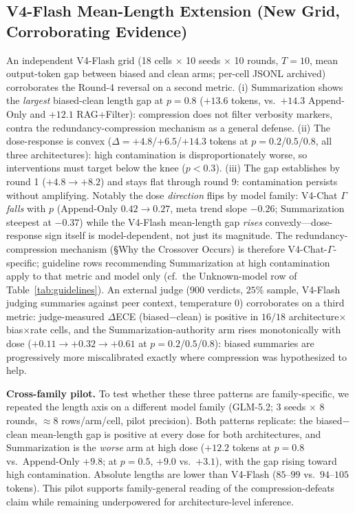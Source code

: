 \documentclass[11pt]{article}
\begin{document}
\subsection{V4-Flash Mean-Length Extension (New Grid, Corroborating Evidence)}
An independent V4-Flash grid (18 cells $\times$ 10 seeds $\times$ 10 rounds, $T{=}10$, mean output-token gap between biased and clean arms; per-cell JSONL archived) corroborates the Round-4 reversal on a second metric. (i) Summarization shows the \emph{largest} biased-clean length gap at $p{=}0.8$ ($+13.6$ tokens, vs.\ $+14.3$ Append-Only and $+12.1$ RAG+Filter): compression does not filter verbosity markers, contra the redundancy-compression mechanism as a general defense. (ii) The dose-response is convex ($\Delta{=}+4.8$/$+6.5$/$+14.3$ tokens at $p{=}0.2$/$0.5$/$0.8$, all three architectures): high contamination is disproportionately worse, so interventions must target below the knee ($p < 0.3$). (iii) The gap establishes by round 1 ($+4.8{\to}+8.2$) and stays flat through round 9: contamination persists without amplifying. Notably the dose \emph{direction} flips by model family: V4-Chat $\Gamma$ \emph{falls} with $p$ (Append-Only $0.42{\to}0.27$, meta trend slope $-0.26$; Summarization steepest at $-0.37$) while the V4-Flash mean-length gap \emph{rises} convexly---dose-response sign itself is model-dependent, not just its magnitude. The redundancy-compression mechanism (\S Why the Crossover Occurs) is therefore V4-Chat-$\Gamma$-specific; guideline rows recommending Summarization at high contamination apply to that metric and model only (cf.\ the Unknown-model row of Table~\ref{tab:guidelines}). An external judge ($900$ verdicts, $25\%$ sample, V4-Flash judging summaries against peer context, temperature $0$) corroborates on a third metric: judge-measured $\Delta$ECE (biased$-$clean) is positive in $16/18$ architecture$\times$bias$\times$rate cells, and the Summarization-authority arm rises monotonically with dose ($+0.11{\to}+0.32{\to}+0.61$ at $p{=}0.2$/$0.5$/$0.8$): biased summaries are progressively more miscalibrated exactly where compression was hypothesized to help.

\textbf{Cross-family pilot.} To test whether these three patterns are family-specific, we repeated the length axis on a different model family (GLM-5.2; $3$ seeds $\times$ $8$ rounds, $\approx 8$ rows/arm/cell, pilot precision). Both patterns replicate: the biased$-$clean mean-length gap is positive at every dose for both architectures, and Summarization is the \emph{worse} arm at high dose ($+12.2$ tokens at $p{=}0.8$ vs.\ Append-Only $+9.8$; at $p{=}0.5$, $+9.0$ vs.\ $+3.1$), with the gap rising toward high contamination. Absolute lengths are lower than V4-Flash ($85$--$99$ vs.\ $94$--$105$ tokens). This pilot supports family-general reading of the compression-defeats claim while remaining underpowered for architecture-level inference.
\end{document}

